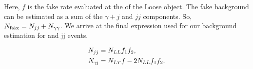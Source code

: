Here, $f$ is the fake rate evaluated at the \pt of the Loose object. The fake background can be estimated as a sum of the $\gamma + j$ and $jj$ components. So, $N_{\textnormal{fake}} =  N_{jj} + N_{\gamma\gamma}$. We arrive at the final expression used for our background estimation for \gj and jj events. 

\begin{equation} \label{eq:nfakederived}
\begin{align}
   N_{jj} &= N_{LL}f_1f_2, \\
   N_{\gamma\textnormal{j}} &= N_{LT}f -  2N_{LL}f_1f_2. 
\end{align}
\end{equation}











